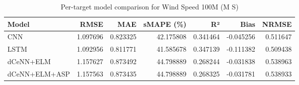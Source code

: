 \begin{table}
\caption{Per-target model comparison for Wind Speed 100M (M S)}
\begin{tabular}{lrrrrrr}
\toprule
Model & RMSE & MAE & sMAPE (\%) & R² & Bias & NRMSE \\
\midrule
CNN & 1.097696 & 0.823325 & 42.175808 & 0.341464 & -0.045256 & 0.511647 \\
LSTM & 1.092956 & 0.811771 & 41.585678 & 0.347139 & -0.111382 & 0.509438 \\
dCeNN+ELM & 1.157627 & 0.873492 & 44.798889 & 0.268244 & -0.031838 & 0.538963 \\
dCeNN+ELM+ASP & 1.157563 & 0.873435 & 44.798889 & 0.268325 & -0.031781 & 0.538933 \\
\bottomrule
\end{tabular}
\end{table}
